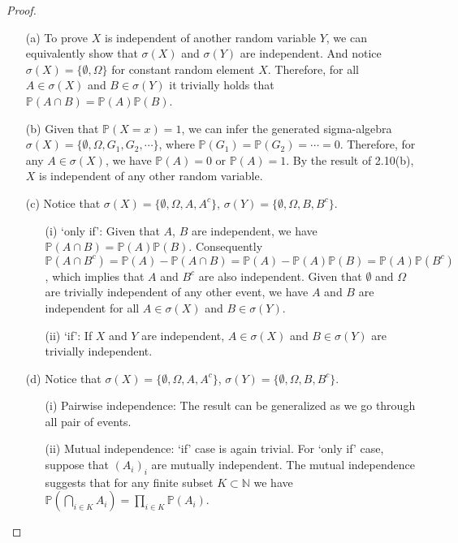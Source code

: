 \begin{proof}

\begin{enumerate}
    \item[(a)] To prove $X$ is independent of another random variable $Y$,
    we can equivalently show that $\sigma(X)$ and $\sigma(Y)$ are independent.
    And notice $\sigma(X) = \{\emptyset, \Omega\}$ for constant random element $X$.
    Therefore, for all $A \in \sigma(X)$ and $B \in \sigma(Y)$ it trivially holds that $\mathbb{P}(A \cap B) = \mathbb{P}(A) \mathbb{P}(B)$.

    \item[(b)] Given that $\mathbb{P}(X = x) = 1$, we can infer the generated sigma-algebra $\sigma(X) = \{\emptyset, \Omega, G_1, G_2, \cdots\}$,
    where $\mathbb{P}(G_1) = \mathbb{P}(G_2) = \cdots = 0$.
    Therefore, for any $A \in \sigma(X)$, we have $\mathbb{P}(A) = 0$ or $\mathbb{P}(A) = 1$.
    By the result of 2.10(b), $X$ is independent of any other random variable.

    \item[(c)] Notice that $\sigma(X) = \{\emptyset, \Omega, A, A^c\}$, $\sigma(Y) = \{\emptyset, \Omega, B, B^c\}$.
    \begin{enumerate}
        \item[(i)] `only if': Given that $A$, $B$ are independent, we have $\mathbb{P}(A \cap B) = \mathbb{P}(A) \mathbb{P}(B)$.
        Consequently $\mathbb{P}(A \cap B^c) = \mathbb{P}(A) - \mathbb{P}(A \cap B) = \mathbb{P}(A) - \mathbb{P}(A) \mathbb{P}(B) = \mathbb{P}(A) \mathbb{P}(B^c)$,
        which implies that $A$ and $B^c$ are also independent.
        Given that $\emptyset$ and $\Omega$ are trivially independent of any other event, we have $A$ and $B$ are independent for all $A \in \sigma(X)$ and $B \in \sigma(Y)$.
        \item[(ii)] `if': If $X$ and $Y$ are independent, $A \in \sigma(X)$ and $B \in \sigma(Y)$ are trivially independent.
    \end{enumerate}

    \item[(d)] Notice that $\sigma(X) = \{\emptyset, \Omega, A, A^c\}$, $\sigma(Y) = \{\emptyset, \Omega, B, B^c\}$.
    \begin{enumerate}
        \item[(i)] Pairwise independence: The result can be generalized as we go through all pair of events.
        \item[(ii)] Mutual independence: `if' case is again trivial. For `only if' case, suppose that $(A_i)_i$ are mutually independent.
        The mutual independence suggests that for any finite subset $K \subset \mathbb{N}$ we have$\mathbb{P}\left(\bigcap_{i \in K} A_{i}\right)=\prod_{i \in K} \mathbb{P}\left(A_{i}\right)$.


\end{enumerate}
\end{enumerate}
\end{proof}
